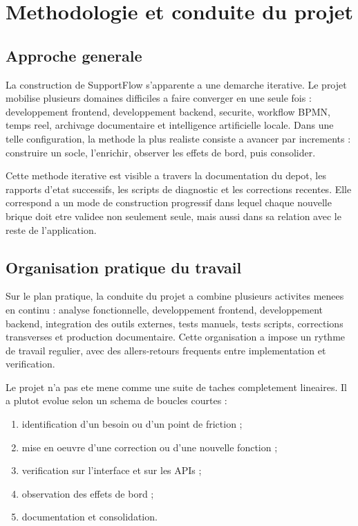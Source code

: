 ﻿\chapter{Methodologie et conduite du projet}

\section{Approche generale}

La construction de SupportFlow s'apparente a une demarche iterative. Le projet mobilise plusieurs domaines difficiles a faire converger en une seule fois : developpement frontend, developpement backend, securite, workflow BPMN, temps reel, archivage documentaire et intelligence artificielle locale. Dans une telle configuration, la methode la plus realiste consiste a avancer par increments : construire un socle, l'enrichir, observer les effets de bord, puis consolider.

Cette methode iterative est visible a travers la documentation du depot, les rapports d'etat successifs, les scripts de diagnostic et les corrections recentes. Elle correspond a un mode de construction progressif dans lequel chaque nouvelle brique doit etre validee non seulement seule, mais aussi dans sa relation avec le reste de l'application.

\section{Organisation pratique du travail}

Sur le plan pratique, la conduite du projet a combine plusieurs activites menees en continu : analyse fonctionnelle, developpement frontend, developpement backend, integration des outils externes, tests manuels, tests scripts, corrections transverses et production documentaire. Cette organisation a impose un rythme de travail regulier, avec des allers-retours frequents entre implementation et verification.

Le projet n'a pas ete mene comme une suite de taches completement lineaires. Il a plutot evolue selon un schema de boucles courtes :

\begin{enumerate}[leftmargin=1.2cm]
  \item identification d'un besoin ou d'un point de friction ;
  \item mise en oeuvre d'une correction ou d'une nouvelle fonction ;
  \item verification sur l'interface et sur les APIs ;
  \item observation des effets de bord ;
  \item documentation et consolidation.
\end{enumerate}

